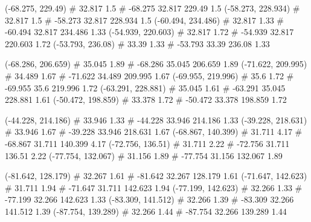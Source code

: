 \documentclass[a4paper,openbib,10pt]{article}
\newenvironment{treegraph}{\begin{graph}}{\end{graph}}
\begin{document}
\begin{treegraph}
  (-68.275, 229.49) #     32.817    1.5
   #    -68.275    32.817    229.49    1.5
  (-58.273, 228.934) #     32.817    1.5
   #    -58.273    32.817    228.934    1.5
  (-60.494, 234.486) #     32.817    1.33
   #    -60.494    32.817    234.486    1.33
  (-54.939, 220.603) #     32.817    1.72
   #    -54.939    32.817    220.603    1.72
  (-53.793, 236.08) #     33.39    1.33
   #    -53.793    33.39    236.08    1.33

  (-68.286, 206.659) #     35.045    1.89
   #    -68.286    35.045    206.659    1.89
  (-71.622, 209.995) #     34.489    1.67
   #    -71.622    34.489    209.995    1.67
  (-69.955, 219.996) #     35.6    1.72
   #    -69.955    35.6    219.996    1.72
  (-63.291, 228.881) #     35.045    1.61
   #    -63.291    35.045    228.881    1.61
  (-50.472, 198.859) #     33.378    1.72
   #    -50.472    33.378    198.859    1.72

  (-44.228, 214.186) #     33.946    1.33
   #    -44.228    33.946    214.186    1.33
  (-39.228, 218.631) #     33.946    1.67
   #    -39.228    33.946    218.631    1.67
  (-68.867, 140.399) #     31.711    4.17
   #    -68.867    31.711    140.399    4.17
  (-72.756, 136.51) #     31.711    2.22
   #    -72.756    31.711    136.51    2.22
  (-77.754, 132.067) #     31.156    1.89
   #    -77.754    31.156    132.067    1.89

  (-81.642, 128.179) #     32.267    1.61
   #    -81.642    32.267    128.179    1.61
  (-71.647, 142.623) #     31.711    1.94
   #    -71.647    31.711    142.623    1.94
  (-77.199, 142.623) #     32.266    1.33
   #    -77.199    32.266    142.623    1.33
  (-83.309, 141.512) #     32.266    1.39
   #    -83.309    32.266    141.512    1.39
  (-87.754, 139.289) #     32.266    1.44
   #    -87.754    32.266    139.289    1.44


\end{treegraph}
\end{document}
